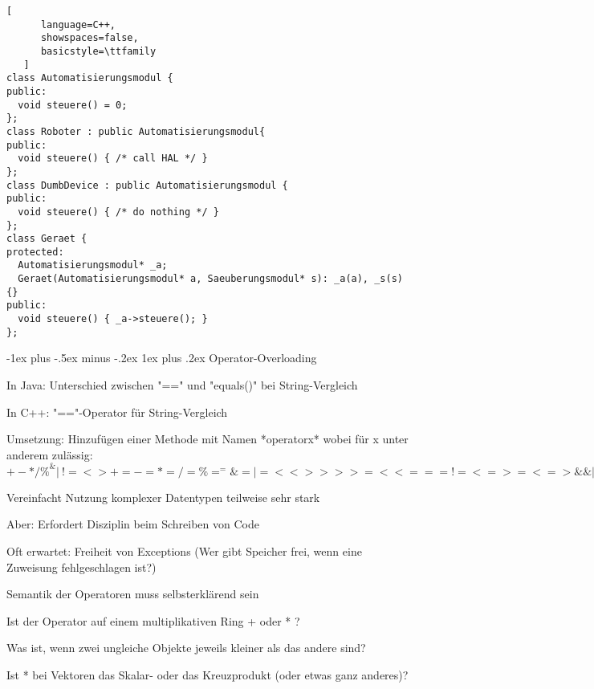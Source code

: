 \documentclass[10pt]{article}
\makeatletter
\renewcommand{\subsubsection}{\@startsection{subsubsection}{3}{0mm}%
                                {-1ex plus -.5ex minus -.2ex}%
                                {1ex plus .2ex}%
                                {\normalfont\small\bfseries}}
\makeatother
\begin{document}
\begin{itemize*}
\begin{lstlisting}[
      language=C++,
      showspaces=false,
      basicstyle=\ttfamily
   ]
class Automatisierungsmodul {
public:
  void steuere() = 0;
};
class Roboter : public Automatisierungsmodul{
public:
  void steuere() { /* call HAL */ }
};
class DumbDevice : public Automatisierungsmodul {
public:
  void steuere() { /* do nothing */ }
};
class Geraet {
protected:
  Automatisierungsmodul* _a;
  Geraet(Automatisierungsmodul* a, Saeuberungsmodul* s): _a(a), _s(s) {}
public:
  void steuere() { _a->steuere(); }
};
\end{lstlisting}

\subsubsection{Operator-Overloading}

\begin{itemize*}
  \item In Java: Unterschied zwischen "==" und "equals()" bei String-Vergleich
  \item In C++: "=="-Operator für String-Vergleich
  \item Umsetzung: Hinzufügen einer Methode mit Namen *operatorx* wobei für x unter anderem zulässig: $+ - * / \% ^ \& | ~ ! = < > += -= *= /= \%= ^= \&= |= << >> >>= <<= == != <= >= <=> \&\& || ++ -- , ->* -> () []$
  \item Vereinfacht Nutzung komplexer Datentypen teilweise sehr stark
  \item Aber: Erfordert Disziplin beim Schreiben von Code
  \begin{itemize*}
    \item Oft erwartet: Freiheit von Exceptions (Wer gibt Speicher frei, wenn eine Zuweisung fehlgeschlagen ist?)
    \item Semantik der Operatoren muss selbsterklärend sein
    \begin{itemize*}
      \item Ist der Operator auf einem multiplikativen Ring + oder * ?
      \item Was ist, wenn zwei ungleiche Objekte jeweils kleiner als das andere sind?
      \item Ist * bei Vektoren das Skalar- oder das Kreuzprodukt (oder etwas ganz anderes)?
    \end{itemize*}
  \end{itemize*}
\end{itemize*}


\end{itemize*}
\end{document}
